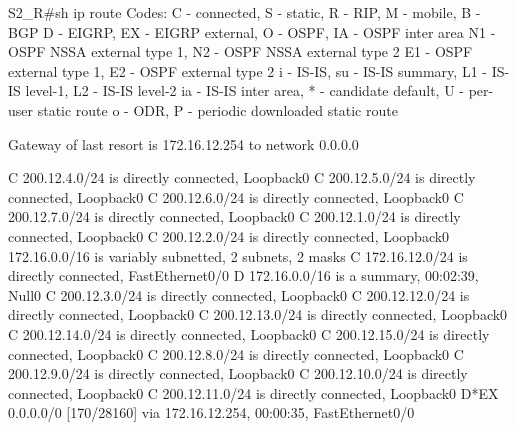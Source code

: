 \documentclass[10pt]{article}
\begin{document}
\begin{itemize}
\begin{verbatim*}
		S2_R#sh ip route
		Codes: C - connected, S - static, R - RIP, M - mobile, B - BGP
		       D - EIGRP, EX - EIGRP external, O - OSPF, IA - OSPF inter area
		       N1 - OSPF NSSA external type 1, N2 - OSPF NSSA external type 2
		       E1 - OSPF external type 1, E2 - OSPF external type 2
		       i - IS-IS, su - IS-IS summary, L1 - IS-IS level-1, L2 - IS-IS level-2
		       ia - IS-IS inter area, * - candidate default, U - per-user static route
		       o - ODR, P - periodic downloaded static route

		Gateway of last resort is 172.16.12.254 to network 0.0.0.0

		C    200.12.4.0/24 is directly connected, Loopback0
		C    200.12.5.0/24 is directly connected, Loopback0
		C    200.12.6.0/24 is directly connected, Loopback0
		C    200.12.7.0/24 is directly connected, Loopback0
		C    200.12.1.0/24 is directly connected, Loopback0
		C    200.12.2.0/24 is directly connected, Loopback0
		     172.16.0.0/16 is variably subnetted, 2 subnets, 2 masks
		C       172.16.12.0/24 is directly connected, FastEthernet0/0
		D       172.16.0.0/16 is a summary, 00:02:39, Null0
		C    200.12.3.0/24 is directly connected, Loopback0
		C    200.12.12.0/24 is directly connected, Loopback0
		C    200.12.13.0/24 is directly connected, Loopback0
		C    200.12.14.0/24 is directly connected, Loopback0
		C    200.12.15.0/24 is directly connected, Loopback0
		C    200.12.8.0/24 is directly connected, Loopback0
		C    200.12.9.0/24 is directly connected, Loopback0
		C    200.12.10.0/24 is directly connected, Loopback0
		C    200.12.11.0/24 is directly connected, Loopback0
		D*EX 0.0.0.0/0 [170/28160] via 172.16.12.254, 00:00:35, FastEthernet0/0
	\end{verbatim*}
\end{itemize}
\end{document}
